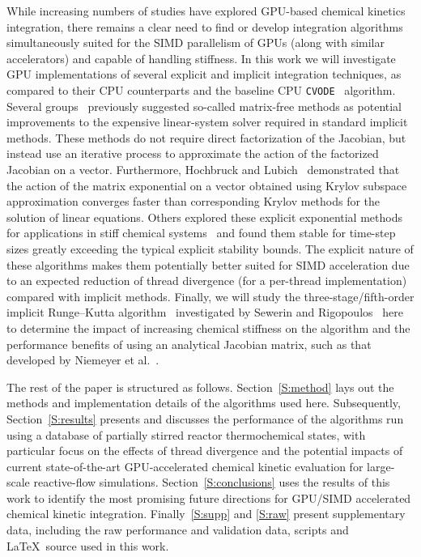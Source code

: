 \documentclass[preprint,review,11pt]{elsarticle}
\begin{document}
While increasing numbers of studies have explored GPU-based chemical kinetics integration, there remains a clear need to find or develop integration algorithms simultaneously suited for the SIMD parallelism of GPUs (along with similar accelerators) and capable of handling stiffness.
In this work we will investigate GPU implementations of several explicit and implicit integration techniques, as compared to their CPU counterparts and the baseline CPU \texttt{CVODE}~\cite{Hindmarsh:2005hg} algorithm.
Several groups~\cite{Perini20141180,McNenly2015581} previously suggested so-called matrix-free methods as potential improvements to the expensive linear-system solver required in standard implicit methods.
These methods do not require direct factorization of the Jacobian, but instead use an iterative process to approximate the action of the factorized Jacobian on a vector.
Furthermore, Hochbruck and Lubich~\cite{Hochbruck:1997} demonstrated that the action of the matrix exponential on a vector obtained using Krylov subspace approximation converges faster than corresponding Krylov methods for the solution of linear equations.
Others explored these explicit exponential methods for applications in stiff chemical systems~\cite{Bisetti:2012jw,falati2011integration} and found them stable for time-step sizes greatly exceeding the typical explicit stability bounds.
The explicit nature of these algorithms makes them potentially better suited for SIMD acceleration due to an expected reduction of thread divergence (for a per-thread implementation) compared with implicit methods.
Finally, we will study the three-stage\slash fifth-order implicit Runge--Kutta algorithm~\cite{wanner1991solving} investigated by Sewerin and Rigopoulos~\cite{Sewerin20151375} here to determine the impact of increasing chemical stiffness on the algorithm and the performance benefits of using an analytical Jacobian matrix, such as that developed by Niemeyer et al.~\cite{niemeyer_2016_51139,Niemeyer:2015ws,Niemeyer:2016aa}.

The rest of the paper is structured as follows.
Section~\ref{S:method} lays out the methods and implementation details of the algorithms used here.
Subsequently, Section~\ref{S:results} presents and discusses the performance of the algorithms run using a database of partially stirred reactor thermochemical states, with particular focus on the effects of thread divergence and the potential impacts of current state-of-the-art GPU-accelerated chemical kinetic evaluation for large-scale reactive-flow simulations.
Section~\ref{S:conclusions} uses the results of this work to identify the most promising future directions for GPU\slash SIMD accelerated chemical kinetic integration.
Finally~\ref{S:supp} and \ref{S:raw} present supplementary data, including the raw performance and validation data, scripts and \LaTeX\ source used in this work.
\end{document}
